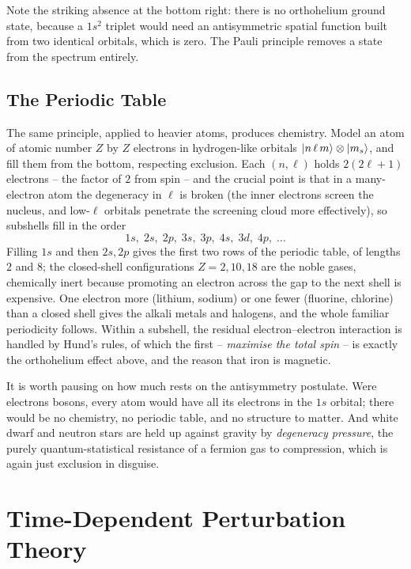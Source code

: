 \documentclass[a4paper]{scrartcl}
\begin{document}
Note the striking absence at the bottom right: there is no orthohelium ground state, because a $1s^2$ triplet would need an antisymmetric spatial function built from two identical orbitals, which is zero. The Pauli principle removes a state from the spectrum entirely.

\subsection{The Periodic Table}

The same principle, applied to heavier atoms, produces chemistry. Model an atom of atomic number $Z$ by $Z$ electrons in hydrogen-like orbitals $\ket{n\,\ell\,m}\otimes\ket{m_s}$, and fill them from the bottom, respecting exclusion. Each $(n,\ell)$  holds $2(2\ell+1)$ electrons -- the factor of $2$ from spin -- and the crucial point is that in a many-electron atom the degeneracy in $\ell$ is broken (the inner electrons screen the nucleus, and low-$\ell$ orbitals penetrate the screening cloud more effectively), so subshells fill in the order
$$
1s,\; 2s,\; 2p,\; 3s,\; 3p,\; 4s,\; 3d,\; 4p,\; \dots
$$
Filling $1s$ and then $2s, 2p$ gives the first two rows of the periodic table, of lengths $2$ and $8$; the closed-shell configurations $Z = 2, 10, 18$ are the noble gases, chemically inert because promoting an electron across the gap to the next shell is expensive. One electron more (lithium, sodium) or one fewer (fluorine, chlorine) than a closed shell gives the alkali metals and halogens, and the whole familiar periodicity follows. Within a subshell, the residual electron--electron interaction is handled by Hund's rules, of which the first -- \emph{maximise the total spin} -- is exactly the orthohelium effect above, and the reason that iron is magnetic.

\begin{remark}
    It is worth pausing on how much rests on the antisymmetry postulate. Were electrons bosons, every atom would have all its electrons in the $1s$ orbital; there would be no chemistry, no periodic table, and no structure to matter. And white dwarf and neutron stars are held up against gravity by \emph{degeneracy pressure}, the purely quantum-statistical resistance of a fermion gas to compression, which is again just exclusion in disguise.
\end{remark}

\section{Time-Dependent Perturbation Theory}\label{sec:tdpt}
\end{document}

